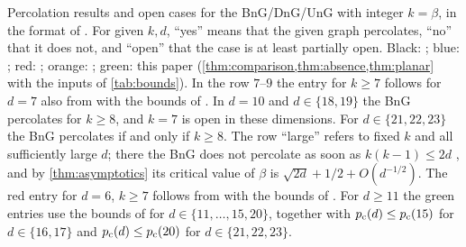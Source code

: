 \begin{table}[ht]
\caption{Percolation results and open cases for the BnG/DnG/UnG with integer $k=\beta$, in the format of \cite[Table~1]{BJKLRT25}. For given $k,d$, ``yes'' means that the given graph percolates, ``no'' that it does not, and ``open'' that the case is at least partially open. Black: \cite{JKLT25}; blue: \cite{CHJK26}; red: \cite{BJKLRT25}; orange: \cite{LXZ26}; green: this paper (\cref{thm:comparison,thm:absence,thm:planar} with the inputs of \cref{tab:bounds}). In the row $7$--$9$ the entry for $k\ge7$ follows for $d=7$ also from \cite[Corollary~3.11]{BJKLRT25} with the bounds of \cite{GPS26}. In $d=10$ and $d\in\{18,19\}$ the BnG percolates for $k\ge8$, and $k=7$ is open in these dimensions. For $d\in\{21,22,23\}$ the BnG percolates if and only if $k\ge8$. The row ``large'' refers to fixed $k$ and all sufficiently large $d$; there the BnG does not percolate as soon as $k(k-1)\le2d$ \cite[Lemma~2.6]{JKLT25}, and by \cref{thm:asymptotics} its critical value of $\beta$ is $\sqrt{2d}+1/2+O(d^{-1/2})$. The red entry for $d=6$, $k\ge7$ follows from \cite[Corollary~3.11]{BJKLRT25} with the bounds of \cite{GPS26}. For $d\ge11$ the green entries use the bounds of \cite[Theorem~1.2]{FvdH17} for $d\in\{11,\dots,15,20\}$, together with $\pc(d)\le\pc(15)$ for $d\in\{16,17\}$ and $\pc(d)\le\pc(20)$ for $d\in\{21,22,23\}$.}\label{tab:integer}
\end{table}

